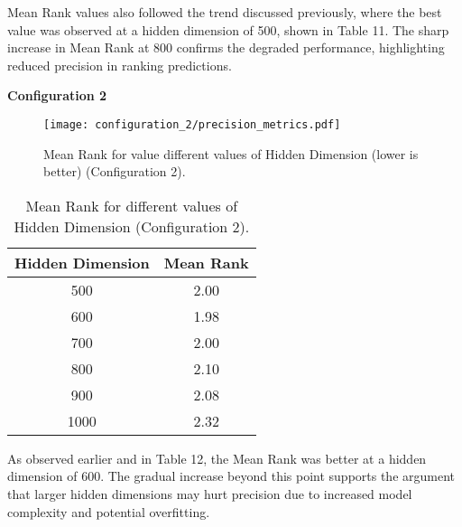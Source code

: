 Mean Rank values also followed the trend discussed previously, where the best value was observed at a hidden dimension of 500, shown in Table 11. The sharp increase in Mean Rank at 800 confirms the degraded performance, highlighting reduced precision in ranking predictions.

\vspace{0.5cm}
\textbf{Configuration 2}
\begin{figure}[H]
    \centering
    \texttt{[image: configuration\_2/precision\_metrics.pdf]}
    \caption{Mean Rank for value different values of Hidden Dimension (lower is better) (Configuration 2).}  
    \label{fig:precision_metrics_c2}               
\end{figure}


\begin{table}[h]
\centering
\caption{Mean Rank for different values of Hidden Dimension (Configuration 2).}
\begin{tabular}{|c|c|}
\hline
Hidden Dimension & Mean Rank \\
\hline
500  & 2.00\\
600  & 1.98\\
700  & 2.00\\
800  & 2.10\\
900  & 2.08\\
1000  & 2.32\\
\hline
\end{tabular}
\label{tab:precison_metrics_table_c2}
\end{table}

As observed earlier and in Table 12, the Mean Rank was better at a hidden dimension of 600. The gradual increase beyond this point supports the argument that larger hidden dimensions may hurt precision due to increased model complexity and potential overfitting.












